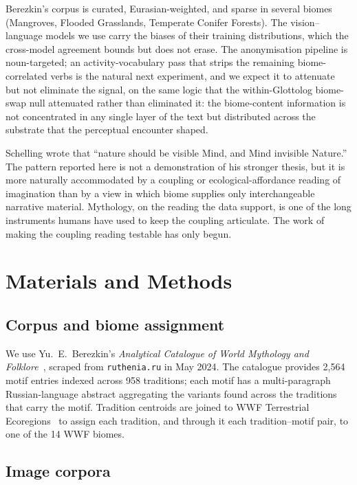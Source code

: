 \documentclass[11pt,a4paper]{article}
\begin{document}
Berezkin's corpus is curated, Eurasian-weighted, and sparse in
several biomes (Mangroves, Flooded Grasslands, Temperate Conifer
Forests). The vision--language models we use carry the biases of
their training distributions, which the cross-model agreement
bounds but does not erase. The anonymisation pipeline is
noun-targeted; an activity-vocabulary pass that strips the
remaining biome-correlated verbs is the natural next experiment,
and we expect it to attenuate but not eliminate the signal, on
the same logic that the within-Glottolog biome-swap null
attenuated rather than eliminated it: the biome-content
information is not concentrated in any single layer of the text
but distributed across the substrate that the perceptual
encounter shaped.

Schelling wrote that ``nature should be visible Mind, and Mind
invisible Nature.'' The pattern reported here is not a
demonstration of his stronger thesis, but it is more naturally
accommodated by a coupling or ecological-affordance reading of
imagination than by a view in which biome supplies only
interchangeable narrative material. Mythology, on the reading
the data support, is one of the long instruments humans have
used to keep the coupling articulate. The work of making the
coupling reading testable has only begun.

\section*{Materials and Methods}

\subsection*{Corpus and biome assignment}

We use Yu.\ E.\ Berezkin's \emph{Analytical Catalogue of World
Mythology and Folklore}~\citep{berezkin2024catalogue}, scraped from
\texttt{ruthenia.ru} in May 2024. The catalogue provides 2{,}564 motif
entries indexed across 958 traditions; each motif has a
multi-paragraph Russian-language abstract aggregating the variants
found across the traditions that carry the motif. Tradition centroids
are joined to WWF Terrestrial
Ecoregions~\citep{olson2001terrestrial} to assign each tradition, and
through it each tradition--motif pair, to one of the 14 WWF biomes.

\subsection*{Image corpora}
\end{document}
